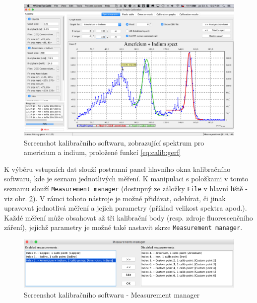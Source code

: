 \begin{figure}[t]
	\begin{center}
		\includegraphics[width=15cm]{figures/calibsw_spectra_all.png}
		\caption{Screenshot kalibračního softwaru, zobrazující spektrum pro americium a indium, proložené funkcí \ref{eq:calib:gerf}}
		\label{fig:calib:sw_spektra}
	\end{center}
\end{figure}

K výběru vstupních dat slouží postranní panel hlavního okna kalibračního softwaru, kde je seznam jednotlivých měření. K manipulaci s položkami v tomto seznamu slouží \texttt{Measurement manager} (dostupný ze záložky \texttt{File} v hlavní liště - viz obr. \ref{fig:calib:sw_measurmanag}). V rámci tohoto nástroje je možné přidávat, odebírat, či jinak upravovat jednotlivá měření a jejich parametry (příklad velikost spektra apod.). Každé měření může obsahovat až tři kalibrační body (resp. zdroje fluorescenčního záření), jejichž parametry je možné také nastavit skrze \texttt{Measurement manager}.

\begin{figure}[th!]
	\begin{center}
		\includegraphics[width=15cm]{figures/calibsw_manager.png}
		\caption{Screenshot kalibračního softwaru - Measurement manager}
		\label{fig:calib:sw_measurmanag}
	\end{center}
\end{figure}


